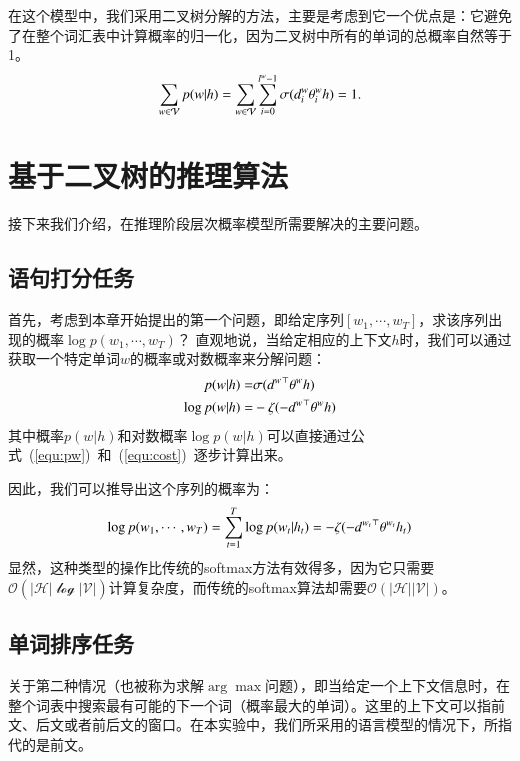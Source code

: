 在这个模型中，我们采用二叉树分解的方法，主要是考虑到它一个优点是：它避免了在整个词汇表中计算概率的归一化，因为二叉树中所有的单词的总概率自然等于1。
\begin{equation}
\setlength{\abovedisplayskip}{6pt}
\setlength{\belowdisplayskip}{6pt}
\sum_{w\in \mathcal{V}}{p(w|h)}=\sum_{w \in \mathcal{V}}\sum_{i=0}^{l^w-1}{\sigma(d_i^w\theta_{i}^w h)}=1.
\end{equation}



\section{基于二叉树的推理算法}
接下来我们介绍，在推理阶段层次概率模型所需要解决的主要问题。
\subsection{语句打分任务}
首先，考虑到本章开始提出的第一个问题，即给定序列$ [w_1,\cdots,w_T] $，求该序列出现的概率$   \log p(w_1,\cdots, w_T)$？ 直观地说，当给定相应的上下文$ h $时，我们可以通过获取一个特定单词$ w $的概率或对数概率来分解问题：
\begin{equation}
\setlength{\abovedisplayskip}{6pt}
\setlength{\belowdisplayskip}{6pt}
\begin{split}
    p(w|h) =&\sigma({d^w}^\top \theta^w h)\\
   \log p(w|h) =& -\zeta(- {d^{w}}^\top \theta^{w} h )
\end{split}
\end{equation}
其中概率$ p(w|h)$和对数概率$\log p(w | h)$可以直接通过公式~(\ref{equ:pw})~和~(\ref{equ:cost})~逐步计算出来。

因此，我们可以推导出这个序列的概率为：
\begin{equation}
\setlength{\abovedisplayskip}{6pt}
\setlength{\belowdisplayskip}{6pt}
   \log p(w_1,\cdots, w_T)=\sum_{t=1}^T\log p(w_t|h_t) = -\zeta(- {d^{w_t}}^\top \theta^{w_t} h_t )
\end{equation}
显然，这种类型的操作比传统的softmax方法有效得多，因为它只需要$\mathcal{O}(\mathcal {| H | \log| V |})$计算复杂度，而传统的softmax算法却需要$\mathcal{O}(\mathcal {|H||V|})$。

\subsection{单词排序任务}
关于第二种情况（也被称为求解$\arg\max$问题），即当给定一个上下文信息时，在整个词表中搜索最有可能的下一个词（概率最大的单词）。这里的上下文可以指前文、后文或者前后文的窗口。在本实验中，我们所采用的语言模型的情况下，所指代的是前文。

